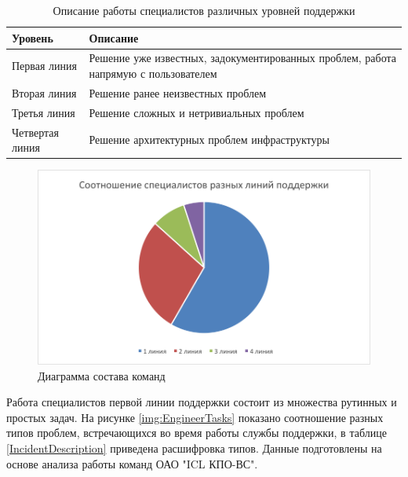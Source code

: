 \begin{table} [htbp]
  \centering
  \parbox{15cm}{\caption{Описание работы специалистов различных уровней поддержки}\label{TSSDescription}}
  \begin{tabular}{| p{7cm} | p{7cm} |}
    \hline
\textbf{Уровень} & \textbf{Описание} \\
  \hline
    

Первая линия	& Решение уже известных, задокументированных проблем, работа напрямую с пользователем \\
  \hline

Вторая линия  & Решение ранее неизвестных проблем \\
  \hline

Третья линия & Решение сложных и нетривиальных проблем \\
  \hline

Четвертая линия  & Решение архитектурных проблем инфраструктуры \\

  \hline
  
  \end{tabular}
\end{table}



\begin{figure} [h] 
  \center
  \includegraphics [scale=0.7] {ITSMTeamComposition}
  \caption{Диаграмма состава команд} 
  \label{img:ITSMTeamComposition}  
\end{figure}

Работа специалистов первой линии поддержки состоит из множества рутинных и простых задач. На рисунке \ref{img:EngineerTasks} показано соотношение разных типов проблем, встречающихся во время работы службы поддержки, в таблице \ref{IncidentDescription} приведена расшифровка типов. Данные подготовлены на основе анализа работы команд ОАО "ICL КПО-ВС".

